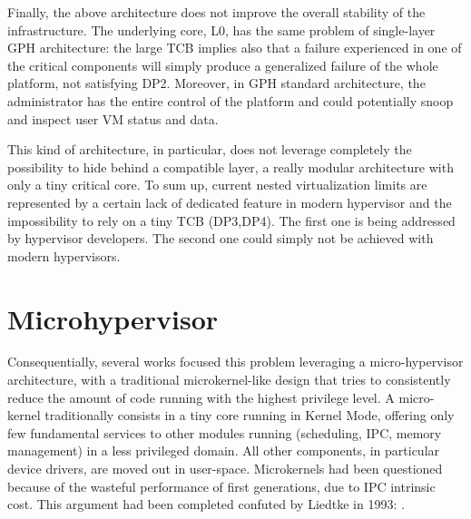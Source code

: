 \documentclass{sig-alternate}
\begin{document}
Finally, the above architecture does not improve the overall stability of the infrastructure. The underlying core, L0, has the same problem of single-layer GPH architecture: the large TCB implies also that a failure experienced in one of the critical components will simply produce a generalized failure of the whole platform, not satisfying DP2. Moreover, in GPH standard architecture, the administrator has the entire control of the platform and could potentially snoop and inspect user VM status and data.

This kind of architecture, in particular, does not leverage completely the possibility to hide behind a compatible layer, a really modular architecture with only a tiny critical core.
To sum up, current nested virtualization limits are represented by a certain lack of dedicated feature in modern hypervisor and the impossibility to rely on a tiny TCB (DP3,DP4).
The first one is being addressed by hypervisor developers. The second one could simply not be achieved with modern hypervisors. 

\section{Microhypervisor}


Consequentially, several works focused this problem leveraging a micro-hypervisor architecture, with a traditional microkernel-like design that tries to consistently reduce the amount of code running with the highest privilege level. A micro-kernel traditionally consists in a tiny core running in Kernel Mode, offering only few fundamental services to other modules running (scheduling, IPC, memory management) in a less privileged domain. All other components, in particular device drivers, are moved out in user-space.
Microkernels had been questioned because of the wasteful performance of first generations, due to IPC intrinsic cost. This argument had been completed confuted by Liedtke in 1993: \cite{liedtke1993ImpIPCbyKerDes,liedtke1995micCon}.
\end{document}
